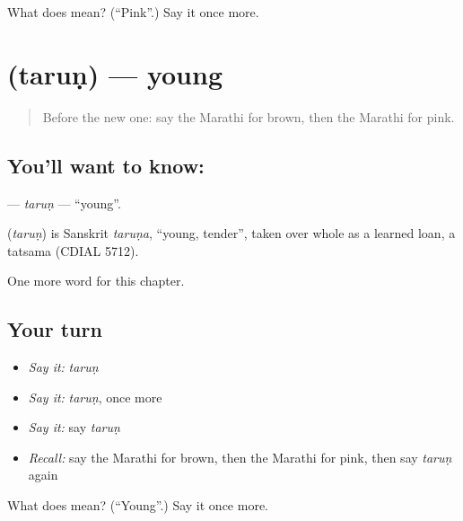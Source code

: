 \begin{tcolorbox}[breakable,colback=teal!4,colframe=teal!35!black,title={Before you move on}]
What does  mean? (\textquotedblleft{}Pink\textquotedblright{}.) Say it once more.
\end{tcolorbox}
\section[\texorpdfstring{\mr{तरुण} (taruṇ)}{तरुण (taruṇ)}]{ (taruṇ) — young}

\label{lesson:MR-C108-tarun}



\begin{quote}
Before the new one: say the Marathi for brown, then the Marathi for pink.
\end{quote}

\subsection*{You'll want to know: }
\textbf{} — \emph{taruṇ} — \textquotedblleft{}young\textquotedblright{}.

\begin{cousinweb}
\textbf{} (\emph{taruṇ}) is Sanskrit \emph{taruṇa}, \textquotedblleft{}young, tender\textquotedblright{}, taken over whole as a learned loan, a tatsama (CDIAL 5712).
\end{cousinweb}

\begin{grammarlens}[title={What you've built}]
One more word for this chapter.
\end{grammarlens}

\subsection*{Your turn}
\begin{itemize}
\raggedright
  \item \emph{Say it:} \emph{taruṇ}
  \item \emph{Say it:} \emph{taruṇ}, once more
  \item \emph{Say it:} say \emph{taruṇ}
  \item \emph{Recall:} say the Marathi for brown, then the Marathi for pink, then say \emph{taruṇ} again
\end{itemize}

\begin{tcolorbox}[breakable,colback=teal!4,colframe=teal!35!black,title={Before you move on}]
What does  mean? (\textquotedblleft{}Young\textquotedblright{}.) Say it once more.
\end{tcolorbox}
